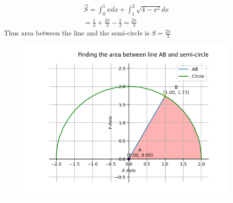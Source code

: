 \documentclass[journal]{IEEEtran}
\begin{document}
\begin{align}
	\vec{S} = \int_{0}^{1} x dx + \int_{1}^{2} \sqrt{4-x^{2}} dx \\
	=  \frac{1}{2} + \frac{2\pi}{3}  - \frac{1}{2} = \frac{2\pi}{3}
\end{align}
Thus area between the line and the semi-circle  is $S= \frac{2\pi}{3}$\\
	\begin{figure}[h!]
		\centering
		\includegraphics[width=0.9\linewidth]{figs/fig1.png}
	\end{figure}	
\end{document}
